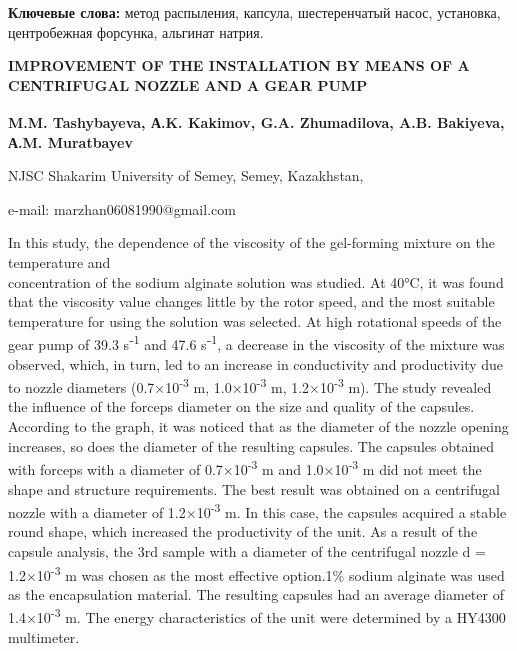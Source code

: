 {\bfseries Ключевые слова:} метод распыления, капсула, шестеренчатый насос,
установка, центробежная форсунка, альгинат натрия.

\begin{articleheader}
{\bfseries IMPROVEMENT OF THE INSTALLATION BY MEANS OF A CENTRIFUGAL NOZZLE
AND A GEAR PUMP}

{\bfseries
M.M. Tashybayeva\textsuperscript{\envelope },
А.K. Kakimov,
G.A. Zhumadilova,
A.B. Bakiyeva,
А.M. Muratbayev
}
\end{articleheader}

\begin{affiliation}
NJSC Shakarim University of Semey, Semey, Kazakhstan,

e-mail: marzhan06081990@gmail.com
\end{affiliation}

In this study, the dependence of the viscosity of the gel-forming
mixture on the temperature and \\concentration of the sodium alginate
solution was studied. At 40°C, it was found that the viscosity value
changes little by the rotor speed, and the most suitable temperature for
using the solution was selected. At high rotational speeds of the gear
pump of 39.3 s⁻\textsuperscript{1} and 47.6 s⁻\textsuperscript{1}, a
decrease in the viscosity of the mixture was observed, which, in turn,
led to an increase in conductivity and productivity due to nozzle
diameters (0.7×10\textsuperscript{-3} m, 1.0×10\textsuperscript{-3} m,
1.2×10\textsuperscript{-3} m). The study revealed the influence of the
forceps diameter on the size and quality of the capsules. According to
the graph, it was noticed that as the diameter of the nozzle opening
increases, so does the diameter of the resulting capsules. The capsules
obtained with forceps with a diameter of 0.7×10\textsuperscript{-3} m
and 1.0×10\textsuperscript{-3} m did not meet the shape and structure
requirements. The best result was obtained on a centrifugal nozzle with
a diameter of 1.2×10\textsuperscript{-3} m. In this case, the capsules
acquired a stable round shape, which increased the productivity of the
unit. As a result of the capsule analysis, the 3rd sample with a
diameter of the centrifugal nozzle d = 1.2×10\textsuperscript{-3} m was
chosen as the most effective option.1\% sodium alginate was used as the
encapsulation material. The resulting capsules had an average diameter
of 1.4×10\textsuperscript{-3} m. The energy characteristics of the unit
were determined by a HY4300 multimeter.

